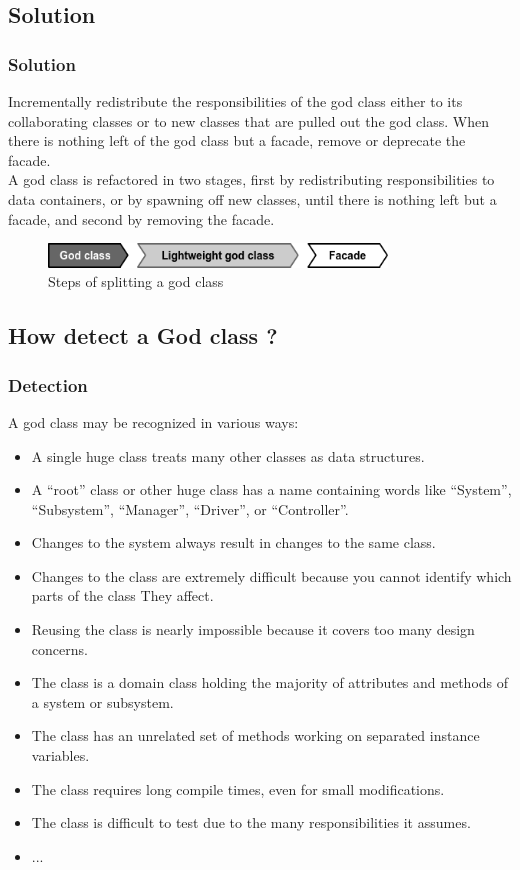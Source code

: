 \documentclass{beamer}
\begin{document}
\subsection{Solution}
\begin{frame}
\frametitle{Solution}
Incrementally redistribute the responsibilities of the god class either to its collaborating classes or to new classes that are pulled out the god class. When there is nothing left of the god class but a facade, remove or deprecate the facade.\\
A god class is refactored in two stages, first by redistributing responsibilities to data containers, or by spawning off new classes, until there is nothing left but a facade, and second by removing the facade.
\begin{figure}[H]
\includegraphics[width=9cm]{steps-god-class.png}
\caption{Steps of splitting a god class}
\end{figure}
\end{frame}

\subsection{How detect a God class ?}
\begin{frame}
\frametitle{Detection}
A god class may be recognized in various ways:
\begin{itemize}
\item A single huge class treats many other classes as data structures.
\item A “root” class or other huge class has a name containing words like “System”, “Subsystem”, “Manager”, “Driver”, or “Controller”.
\item Changes to the system always result in changes to the same class.
\item Changes to the class are extremely difficult because you cannot identify which parts of the class They affect.
\item Reusing the class is nearly impossible because it covers too many design concerns.
\item The class is a domain class holding the majority of attributes and methods of a system or subsystem.
\item The class has an unrelated set of methods working on separated instance variables.
\item The class requires long compile times, even for small modifications.
\item The class is difficult to test due to the many responsibilities it assumes.
\item ... %
\end{itemize}
\end{frame}
\end{document}
